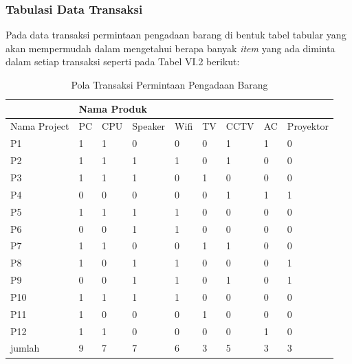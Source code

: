 \subsubsection{Tabulasi Data Transaksi}
Pada data transaksi permintaan pengadaan barang di bentuk tabel tabular yang akan mempermudah dalam mengetahui berapa banyak \textit{item} yang ada diminta dalam setiap transaksi seperti pada Tabel VI.2 berikut:
\begin{table}[!h]
\caption{Pola Transaksi Permintaan Pengadaan Barang}
\begin{center}
\begin{tabular}{|l|l|l|l|l|l|l|l|l|}
\hline
             & \multicolumn{8}{l|}{Nama Produk}                       \\ \hline
Nama Project & PC & CPU & Speaker & Wifi & TV & CCTV & AC & Proyektor \\ \hline
P1           & 1  & 1   & 0       & 0    & 0  & 1    & 1  & 0         \\ \hline
P2           & 1  & 1   & 1       & 1    & 0  & 1    & 0  & 0         \\ \hline
P3           & 1  & 1   & 1       & 0    & 1  & 0    & 0  & 0         \\ \hline
P4           & 0  & 0   & 0       & 0    & 0  & 1    & 1  & 1         \\ \hline
P5           & 1  & 1   & 1       & 1    & 0  & 0    & 0  & 0         \\ \hline
P6           & 0  & 0   & 1       & 1    & 0  & 0    & 0  & 0         \\ \hline
P7           & 1  & 1   & 0       & 0    & 1  & 1    & 0  & 0         \\ \hline
P8           & 1  & 0   & 1       & 1    & 0  & 0    & 0  & 1         \\ \hline
P9           & 0  & 0   & 1       & 1    & 0  & 1    & 0  & 1         \\ \hline
P10          & 1  & 1   & 1       & 1    & 0  & 0    & 0  & 0         \\ \hline
P11          & 1  & 0   & 0       & 0    & 1  & 0    & 0  & 0         \\ \hline
P12          & 1  & 1   & 0       & 0    & 0  & 0    & 1  & 0         \\ \hline
jumlah       & 9  & 7   & 7       & 6    & 3  & 5    & 3  & 3         \\ \hline
\end{tabular}
\end{center}
\end{table}

